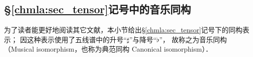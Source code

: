 



\subsection{\S\ref{chmla:sec_tensor}记号中的音乐同构}\label{chrg:sec_music-iso}
为了读者能更好地阅读其它文献，本小节给出\S\ref{chmla:sec_tensor}记号下的同构表示；
因这种表示使用了五线谱中的升号“$\sharp$”与降号“$\flat$”，
故称之为{\heiti 音乐同构}（Musical isomorphism，也称为典范同构 Canonical isomorphism）．


